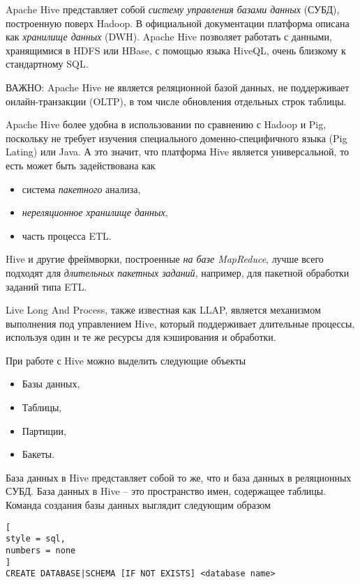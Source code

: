 \documentclass[%
	11pt,
	a4paper,
	utf8,
		]{article}
\begin{document}
Apache Hive представляет собой \emph{систему управления базами данных} (СУБД), построенную поверх Hadoop. В официальной документации платформа описана как \emph{хранилище данных} (DWH). Apache Hive позволяет работать с данными, хранящимися в HDFS или HBase, с помощью языка HiveQL, очень близкому к стандартному SQL.

ВАЖНО: Apache Hive не является реляционной базой данных, не поддерживает онлайн-транзакции (OLTP), в том числе обновления отдельных строк таблицы.

Apache Hive более удобна в использовании по сравнению с Hadoop и Pig, поскольку не требует изучения специального доменно-специфичного языка (Pig Lating) или Java. А это значит, что платформа Hive является универсальной, то есть может быть задействована как
\begin{itemize}
	\item система \emph{пакетного} анализа,
	
	\item \emph{нереляционное хранилище данных},
	
	\item часть процесса ETL.
\end{itemize}

Hive и другие фреймворки, построенные \emph{на базе MapReduce}, лучше всего подходят для \emph{длительных пакетных заданий}, например, для пакетной обработки заданий типа ETL.

Live Long And Process, также известная как LLAP, является механизмом выполнения под управлением Hive, который поддерживает длительные процессы, используя один и те же ресурсы для кэширования и обработки.

При работе с Hive можно выделить следующие объекты
\begin{itemize}
	\item Базы данных,
	
	\item Таблицы,
	
	\item Партиции,
	
	\item Бакеты.
\end{itemize}

База данных в Hive представляет собой то же, что и база данных в реляционных СУБД. База данных в Hive -- это пространство имен, содержащее таблицы. Команда создания базы данных выглядит следующим образом
\begin{lstlisting}[
style = sql,
numbers = none	
]
CREATE DATABASE|SCHEMA [IF NOT EXISTS] <database name>
\end{lstlisting}
\end{document}
